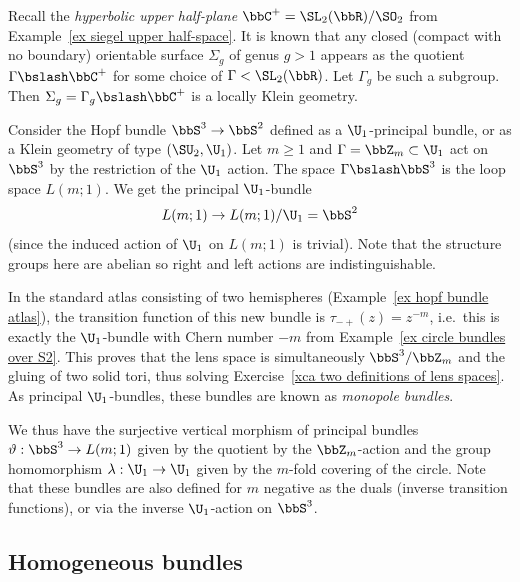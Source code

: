 \begin{example}
    Recall the \emph{hyperbolic upper half-plane} $\bbC^+=\SL_2(\bbR)\slash \SO_2$ from Example~\ref{ex siegel upper half-space}. It is known that any closed (compact with no boundary) orientable surface $\Sigma_g$ of genus $g>1$ appears as the quotient $\Gamma\bslash \bbC^+$ for some choice of $\Gamma<\SL_2(\bbR)$. Let $\Gamma_g$ be such a subgroup. Then $\Sigma_g=\Gamma_g\bslash \bbC^+$ is a locally Klein geometry.
\end{example}

\begin{example}\label{ex monopole bundles}
    Consider the Hopf bundle $\bbS^3\to \bbS^2$ defined as a $\U_1$-principal bundle, or as a Klein geometry of type $(\SU_2,\U_1)$. Let $m\geq 1$ and $\Gamma=\bbZ_m\subset \U_1$ act on $\bbS^3$ by the restriction of the $\U_1$ action. The space $\Gamma\bslash \bbS^3$ is the loop space $L(m;1)$. We get the principal $\U_1$-bundle
    \[L(m;1)\to L(m;1)\slash \U_1=\bbS^2\]
    (since the induced action of $\U_1$ on $L(m;1)$ is trivial).
    Note that the structure groups here are abelian so right and left actions are indistinguishable.
    
    In the standard atlas consisting of two hemispheres (Example~\ref{ex hopf bundle atlas}), the transition function of this new bundle is $\tau_{-+}(z)=z^{-m}$, i.e.\ this is exactly the $\U_1$-bundle with Chern number $-m$ from Example~\ref{ex circle bundles over S2}. This proves that the lens space is simultaneously $\bbS^3\slash \bbZ_m$ and the gluing of two solid tori, thus solving Exercise~\ref{xca two definitions of lens spaces}. As principal $\U_1$-bundles, these bundles are known as \emph{monopole bundles}.

    We thus have the surjective vertical morphism of principal bundles $\vartheta:\bbS^3\to L(m;1)$ given by the quotient by the $\bbZ_m$-action and the group homomorphism $\lambda:\U_1\to \U_1$ given by the $m$-fold covering of the circle. Note that these bundles are also defined for $m$ negative as the duals (inverse transition functions), or via the inverse $\U_1$-action on $\bbS^3$.
\end{example}













\subsection{Homogeneous bundles}\label{sec: homogeneous bundles}



